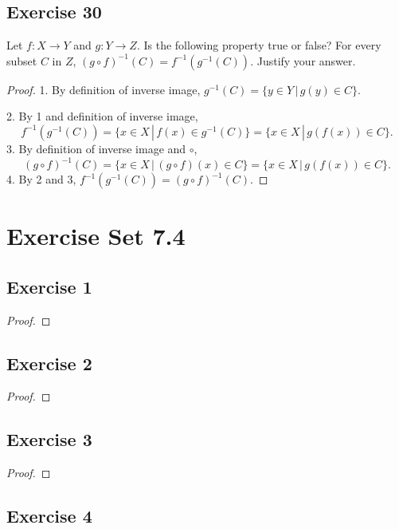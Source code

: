 \documentclass[14pt]{extarticle}
\begin{document}
\subsection{Exercise 30}
Let \(f: X \to Y\) and \(g: Y \to Z\). Is the following property true or false? For every subset $C$ in $Z$, 
\((g \circ f)^{-1}(C) = f^{-1}(g^{-1}(C))\). Justify your answer.

\begin{proof}
1. By definition of inverse image, \(g^{-1}(C) = \{y \in Y \, | \, g(y) \in C\}\).

2. By 1 and definition of inverse image, 
\[
f^{-1}(g^{-1}(C)) = \{x \in X \, | \, f(x) \in g^{-1}(C)\} = \{x \in X \, | \, g(f(x)) \in C\}.
\]
3. By definition of inverse image and $\circ$, 
\[
(g \circ f)^{-1}(C) = \{x \in X \, | \, (g \circ f)(x) \in C\} = \{x \in X \, | \, g(f(x)) \in C\}.
\]
4. By 2 and 3, \(f^{-1}(g^{-1}(C)) = (g \circ f)^{-1}(C)\).
\end{proof}

\section{Exercise Set 7.4}

\subsection{Exercise 1}

\begin{proof}

\end{proof}

\subsection{Exercise 2}

\begin{proof}

\end{proof}

\subsection{Exercise 3}

\begin{proof}

\end{proof}

\subsection{Exercise 4}
\end{document}
